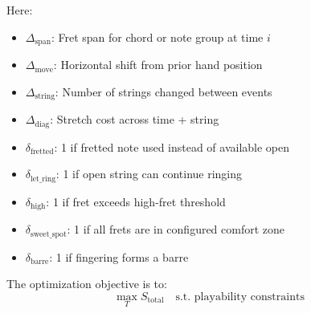 \documentclass[conference]{IEEEtran}
\begin{document}
Here:
\begin{itemize}
\item \( \Delta_{\text{span}} \): Fret span for chord or note group at time \( i \)
\item \( \Delta_{\text{move}} \): Horizontal shift from prior hand position
\item \( \Delta_{\text{string}} \): Number of strings changed between events
\item \( \Delta_{\text{diag}} \): Stretch cost across time + string
\item \( \delta_{\text{fretted}} \): 1 if fretted note used instead of available open
\item \( \delta_{\text{let\_ring}} \): 1 if open string can continue ringing
\item \( \delta_{\text{high}} \): 1 if fret exceeds high-fret threshold
\item \( \delta_{\text{sweet\_spot}} \): 1 if all frets are in configured comfort zone
\item \( \delta_{\text{barre}} \): 1 if fingering forms a barre
\end{itemize}

The optimization objective is to:
\begin{equation}
\max_T S_{\text{total}} \quad \text{s.t. playability constraints}
\end{equation}
\end{document}
